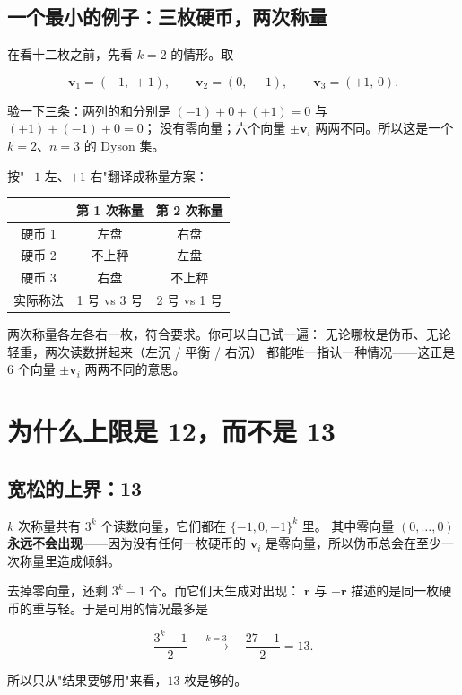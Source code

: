 \documentclass[UTF8,11pt,fontset=macnew]{ctexart}
\newcommand{\vv}{\mathbf{v}}
\newcommand{\rr}{\mathbf{r}}
\begin{document}
\subsection{一个最小的例子：三枚硬币，两次称量}

在看十二枚之前，先看 $k=2$ 的情形。取

\[
\vv_1=(-1,\,+1),\qquad \vv_2=(0,\,-1),\qquad \vv_3=(+1,\,0).
\]

验一下三条：两列的和分别是 $(-1)+0+(+1)=0$ 与 $(+1)+(-1)+0=0$；
没有零向量；六个向量 $\pm\vv_i$ 两两不同。所以这是一个 $k=2$、$n=3$ 的 Dyson 集。

按"$-1$ 左、$+1$ 右"翻译成称量方案：

\begin{center}
\begin{tabular}{c c c}
\toprule
& 第 1 次称量 & 第 2 次称量 \\
\midrule
硬币 1 & 左盘 & 右盘 \\
硬币 2 & 不上秤 & 左盘 \\
硬币 3 & 右盘 & 不上秤 \\
\midrule
实际称法 & 1 号 vs 3 号 & 2 号 vs 1 号 \\
\bottomrule
\end{tabular}
\end{center}

两次称量各左各右一枚，符合要求。你可以自己试一遍：
无论哪枚是伪币、无论轻重，两次读数拼起来（左沉 / 平衡 / 右沉）
都能唯一指认一种情况——这正是 $6$ 个向量 $\pm\vv_i$ 两两不同的意思。

\section{为什么上限是 12，而不是 13}
\label{sec:why12}

\subsection{宽松的上界：13}

$k$ 次称量共有 $3^k$ 个读数向量，它们都在 $\{-1,0,+1\}^k$ 里。
其中零向量 $(0,\dots,0)$ \textbf{永远不会出现}——因为没有任何一枚硬币的
$\vv_i$ 是零向量，所以伪币总会在至少一次称量里造成倾斜。

去掉零向量，还剩 $3^k-1$ 个。而它们天生成对出现：
$\rr$ 与 $-\rr$ 描述的是同一枚硬币的重与轻。于是可用的情况最多是

\[
\frac{3^k-1}{2}
\quad\xrightarrow{\ k=3\ } \quad \frac{27-1}{2}=13 .
\]

所以只从"结果要够用"来看，$13$ 枚是够的。
\end{document}
